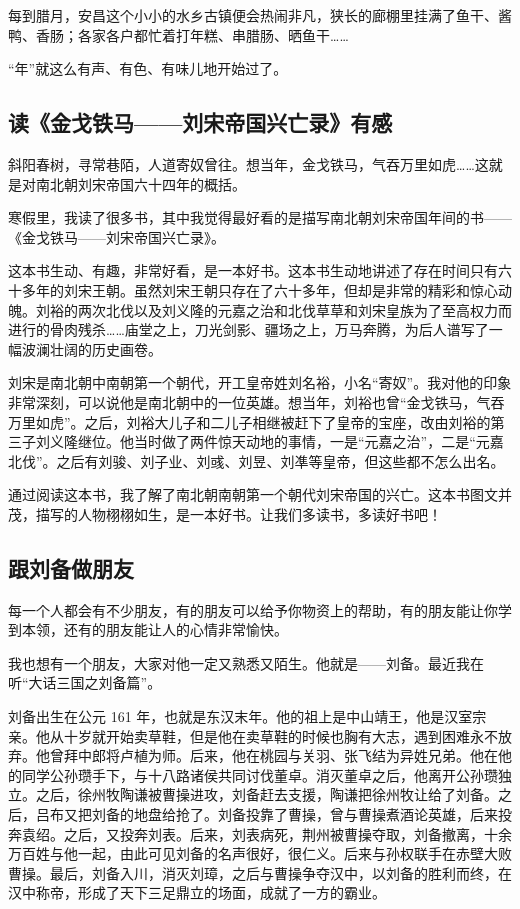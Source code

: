 \documentclass[UTF8,a4paper,titlepage,twoside,10.5pt]{article}
\begin{document}
每到腊月，安昌这个小小的水乡古镇便会热闹非凡，狭长的廊棚里挂满了鱼干、酱鸭、香肠；各家各户都忙着打年糕、串腊肠、晒鱼干……

“年”就这么有声、有色、有味儿地开始过了。

\subsection{读《金戈铁马——刘宋帝国兴亡录》有感}
\label{sec:org6114081}

斜阳春树，寻常巷陌，人道寄奴曾往。想当年，金戈铁马，气吞万里如虎……这就是对南北朝刘宋帝国六十四年的概括。

寒假里，我读了很多书，其中我觉得最好看的是描写南北朝刘宋帝国年间的书——《金戈铁马——刘宋帝国兴亡录》。

这本书生动、有趣，非常好看，是一本好书。这本书生动地讲述了存在时间只有六十多年的刘宋王朝。虽然刘宋王朝只存在了六十多年，但却是非常的精彩和惊心动魄。刘裕的两次北伐以及刘义隆的元嘉之治和北伐草草和刘宋皇族为了至高权力而进行的骨肉残杀……庙堂之上，刀光剑影、疆场之上，万马奔腾，为后人谱写了一幅波澜壮阔的历史画卷。

刘宋是南北朝中南朝第一个朝代，开工皇帝姓刘名裕，小名“寄奴”。我对他的印象非常深刻，可以说他是南北朝中的一位英雄。想当年，刘裕也曾“金戈铁马，气吞万里如虎”。之后，刘裕大儿子和二儿子相继被赶下了皇帝的宝座，改由刘裕的第三子刘义隆继位。他当时做了两件惊天动地的事情，一是“元嘉之治”，二是“元嘉北伐”。之后有刘骏、刘子业、刘彧、刘昱、刘凖等皇帝，但这些都不怎么出名。

通过阅读这本书，我了解了南北朝南朝第一个朝代刘宋帝国的兴亡。这本书图文并茂，描写的人物栩栩如生，是一本好书。让我们多读书，多读好书吧！

\subsection{跟刘备做朋友}
\label{sec:org3b1c1c6}

每一个人都会有不少朋友，有的朋友可以给予你物资上的帮助，有的朋友能让你学到本领，还有的朋友能让人的心情非常愉快。

我也想有一个朋友，大家对他一定又熟悉又陌生。他就是——刘备。最近我在听“大话三国之刘备篇”。

刘备出生在公元 161 年，也就是东汉末年。他的祖上是中山靖王，他是汉室宗亲。他从十岁就开始卖草鞋，但是他在卖草鞋的时候也胸有大志，遇到困难永不放弃。他曾拜中郎将卢植为师。后来，他在桃园与关羽、张飞结为异姓兄弟。他在他的同学公孙瓒手下，与十八路诸侯共同讨伐董卓。消灭董卓之后，他离开公孙瓒独立。之后，徐州牧陶谦被曹操进攻，刘备赶去支援，陶谦把徐州牧让给了刘备。之后，吕布又把刘备的地盘给抢了。刘备投靠了曹操，曾与曹操煮酒论英雄，后来投奔袁绍。之后，又投奔刘表。后来，刘表病死，荆州被曹操夺取，刘备撤离，十余万百姓与他一起，由此可见刘备的名声很好，很仁义。后来与孙权联手在赤壁大败曹操。最后，刘备入川，消灭刘璋，之后与曹操争夺汉中，以刘备的胜利而终，在汉中称帝，形成了天下三足鼎立的场面，成就了一方的霸业。
\end{document}
